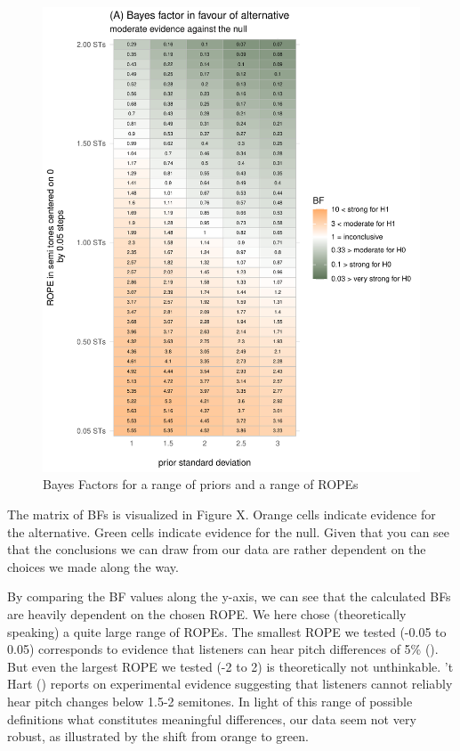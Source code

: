 \documentclass[
  doc,
  longtable,
  nolmodern,
  notxfonts,
  notimes,
  colorlinks=true,linkcolor=blue,citecolor=blue,urlcolor=blue]{apa7}
\begin{document}
\begin{figure}[H]

\caption{Bayes Factors for a range of priors and a range of ROPEs}

{\centering \includegraphics{manuscript_files/figure-pdf/visualize-raster-1.pdf}

}

\end{figure}%

The matrix of BFs is visualized in Figure X. Orange cells indicate
evidence for the alternative. Green cells indicate evidence for the
null. Given that you can see that the conclusions we can draw from our
data are rather dependent on the choices we made along the way.

By comparing the BF values along the y-axis, we can see that the
calculated BFs are heavily dependent on the chosen ROPE. We here chose
(theoretically speaking) a quite large range of ROPEs. The smallest ROPE
we tested (-0.05 to 0.05) corresponds to evidence that listeners can
hear pitch differences of 5\%
(). But even the largest ROPE we tested (-2 to 2) is
theoretically not unthinkable. 't Hart
() reports on
experimental evidence suggesting that listeners cannot reliably hear
pitch changes below 1.5-2 semitones. In light of this range of possible
definitions what constitutes meaningful differences, our data seem not
very robust, as illustrated by the shift from orange to green.
\end{document}
